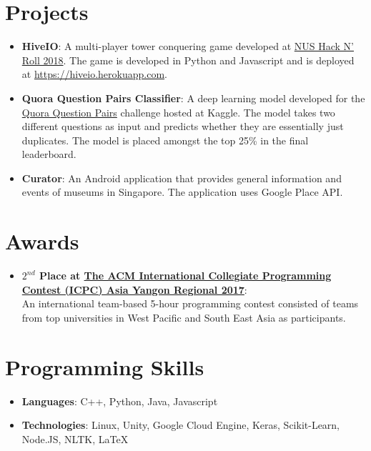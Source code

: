 \documentclass[letterpaper]{article}
\newcommand{\resumeItem}[2]{
  \item\small{
    \textbf{#1}{: #2 \vspace{-2pt}}
  }
}
\newcommand{\resumeSubItem}[2]{\resumeItem{#1}{#2}\vspace{-4pt}}
\newcommand{\resumeSubHeadingListStart}{\begin{itemize}[leftmargin=*]}
\newcommand{\resumeSubHeadingListEnd}{\end{itemize}}
\begin{document}
\section{Projects}
  \resumeSubHeadingListStart
    \resumeSubItem{HiveIO}
      {A multi-player tower conquering game developed at \href{http://hacknroll.nushackers.org/}{NUS Hack N' Roll 2018}. The game is developed in Python and Javascript and is deployed at \url{https://hiveio.herokuapp.com}.}
    \resumeSubItem{Quora Question Pairs Classifier}
      {
      A deep learning model developed for the \href{https://www.kaggle.com/c/quora-question-pairs}{Quora Question Pairs} challenge hosted at Kaggle. The model takes two different questions as input and predicts whether they are essentially just duplicates. The model is placed amongst the top 25\% in the final leaderboard.
      }
    \resumeSubItem{Curator}
      {
      An Android application that provides general information and events of museums in Singapore. The application uses Google Place API.
      }
  \resumeSubHeadingListEnd
  
\section{Awards}
  \resumeSubHeadingListStart
    \resumeSubItem{$2^{nd}$ Place at \href{https://icpc.baylor.edu/regionals/finder/ar-yangon-2017}{The ACM International Collegiate Programming Contest (ICPC) Asia Yangon Regional 2017}}
      {\\An international team-based 5-hour programming contest consisted of teams from top universities in West Pacific and South East Asia as participants.}
  \resumeSubHeadingListEnd

\section{Programming Skills}
  \resumeSubHeadingListStart
    \item{
      \textbf{Languages}{: C++, Python, Java, Javascript}\\
    }
    \item{
    \textbf{Technologies}{: Linux, Unity, Google Cloud Engine, Keras, Scikit-Learn, Node.JS, NLTK, LaTeX}
    }
  \resumeSubHeadingListEnd


\end{document}
